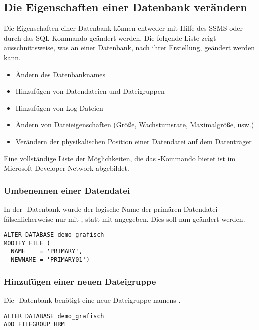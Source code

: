       \subsection{Die Eigenschaften einer Datenbank verändern}
        Die Eigenschaften einer Datenbank können entweder mit Hilfe des SSMS
        oder durch das SQL-Kommando  geändert
        werden. Die folgende Liste zeigt ausschnittsweise, was an einer
        Datenbank, nach ihrer Erstellung, geändert werden kann.
        \begin{itemize}
            \item Ändern des Datenbanknames
            \item Hinzufügen von Datendateien und Dateigruppen
            \item Hinzufügen von Log-Dateien
            \item Ändern von Dateieigenschaften (Größe, Wachstumsrate,
            Maximalgröße, usw.)
            \item Verändern der physikalischen Position einer Datendatei auf
            dem Datenträger
        \end{itemize}
        Eine vollständige Liste der Möglichkeiten, die das
        -Kommando bietet ist im Microsoft
        Developer Network abgebildet.
        \begin{literaturinternet}
          \item \cite{ms174269}
        \end{literaturinternet}
        \subsubsection{Umbenennen einer Datendatei}  
          In der -Datenbank wurde der
          logische Name der primären Datendatei 
          fälschlicherweise nur mit , statt mit
           angegeben. Dies soll nun geändert werden.
          \begin{lstlisting}[language=ms_sql,caption={Den
          logischen Namen einer Datendatei ändern},label=admin03_11]
ALTER DATABASE demo_grafisch
MODIFY FILE (
  NAME    = 'PRIMARY',
  NEWNAME = 'PRIMARY01')          
          \end{lstlisting}
        \subsubsection{Hinzufügen einer neuen Dateigruppe}
          Die -Datenbank benötigt eine neue
          Dateigruppe namens .
          \begin{lstlisting}[language=ms_sql,caption={Eine
          neue Dateigruppe hinzufügen},label=admin03_12]
ALTER DATABASE demo_grafisch
ADD FILEGROUP HRM  
          \end{lstlisting}

